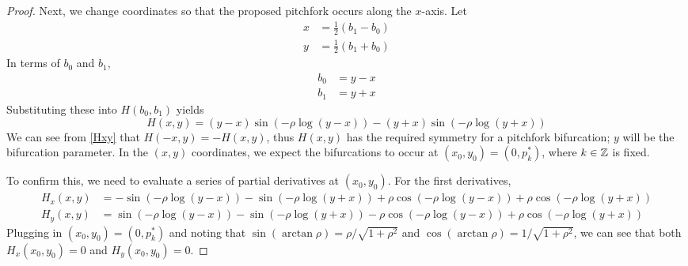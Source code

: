 \documentclass[thesis.tex]{subfiles}
\begin{document}
\begin{lemma}
\begin{proof}
Next, we change coordinates so that the proposed pitchfork occurs along the $x$-axis. Let
\begin{align*}
x &= \frac{1}{2}(b_1 - b_0) \\
y &= \frac{1}{2}(b_1 + b_0)
\end{align*}
In terms of $b_0$ and $b_1$,
\begin{align*}
b_0 &= y - x \\
b_1 &= y + x
\end{align*}
Substituting these into $H(b_0, b_1)$ yields
\begin{equation}\label{Hxy}
H(x, y) = 
(y - x) \sin \left( -\rho \log(y - x) \right) - (y + x) \sin \left( - \rho \log (y + x) \right)
\end{equation}
We can see from \eqref{Hxy} that $H(-x, y) = -H(x, y)$, thus $H(x,y)$ has the required symmetry for a pitchfork bifurcation; $y$ will be the bifurcation parameter. In the $(x,y)$ coordinates, we expect the bifurcations to occur at $(x_0, y_0) = \left(0, p^*_k \right)$, where $k \in {\mathbb Z}$ is fixed.

To confirm this, we need to evaluate a series of partial derivatives at $(x_0, y_0)$. For the first derivatives,
\begin{align*}
H_x(x, y) &= -\sin \left( - \rho \log(y - x) \right) - 
\sin \left( - \rho \log(y + x) \right)
+\rho \cos \left( - \rho \log(y - x) \right) + \rho \cos \left( - \rho \log(y + x) \right) \\
H_y(x, y) &= \sin \left( - \rho \log(y - x) \right) - 
\sin \left( - \rho \log(y + x) \right)
-\rho \cos \left( - \rho \log(y - x) \right) + \rho \cos \left( - \rho \log(y + x) \right)
\end{align*}
Plugging in $(x_0, y_0) = \left(0, p^*_k \right)$ and noting that $\sin(\arctan \rho) = \rho / \sqrt{1 + \rho^2}$ and $\cos(\arctan \rho) = 1 / \sqrt{1 + \rho^2}$, we can see that both $H_x(x_0, y_0) = 0$ and $H_y(x_0, y_0) = 0$. 


\end{proof}
\end{lemma}
\end{document}
